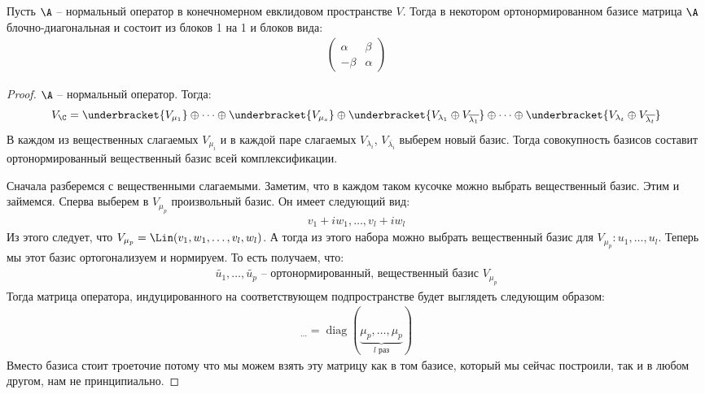 \begin{theorem}
    Пусть $\A$ -- нормальный оператор в конечномерном евклидовом пространстве $V$.
    Тогда в некотором ортонормированном базисе матрица $\A$ блочно-диагональная и состоит из блоков 1 на 1 и блоков вида:
    \begin{gather*}
        \left(\begin{array}{cc}
            \alpha & \beta \\ 
            -\beta & \alpha
        \end{array}\right)
    \end{gather*}
\begin{proof}
    $\A$ -- нормальный оператор. Тогда:
    \begin{gather*}
        V_{\C} = \underbracket{V_{\mu_1}} \oplus \dots \oplus \underbracket{V_{\mu_s}} \oplus \underbracket{V_{\lambda_1} \oplus V_{\overline{\lambda_1}}} \oplus \dots \oplus \underbracket{V_{\lambda_t} \oplus V_{\overline{\lambda_t}}}
    \end{gather*}
    В каждом из вещественных слагаемых $V_{\mu_i}$ и в каждой паре слагаемых $V_{\lambda_i}$, $V_{\overline{\lambda_i}}$ выберем новый базис. 
    Тогда совокупность базисов составит ортонормированный вещественный базис всей комплексификации.
    
    Сначала разберемся с вещественными слагаемыми.
    Заметим, что в каждом таком кусочке можно выбрать вещественный базис.
    Этим и займемся. 
    Сперва выберем в $V_{\mu_p}$ произвольный базис. Он имеет следующий вид:
    \begin{gather*}
        v_1 + iw_1, \dots, v_l + i w_l
    \end{gather*}
    Из этого следует, что $V_{\mu_p} = \Lin (v_1, w_1, \dots, v_l, w_l)$. А тогда
    из этого набора можно выбрать вещественный базис для $V_{\mu_p}: u_1, \dots, u_l$. 
    Теперь мы этот базис ортогонализуем и нормируем. То есть получаем, что:
    \begin{gather*}
        \widetilde{u_1}, \dots, \widetilde{u_p} \text{ -- ортонормированный, вещественный базис } V_{\mu_p}
    \end{gather*}
    Тогда матрица оператора, индуцированного на соответствующем подпространстве будет выглядеть следующим образом: 
    \begin{gather*}
        [\A \, |_{V_{\mu_p} }]_{\dots} = \operatorname{diag} (\underbrace{\mu_p, \dots, \mu_p}_{\text{$l$ раз}})
    \end{gather*}
    Вместо базиса стоит троеточие потому что мы можем взять эту матрицу как в том базисе, который мы сейчас построили, так 
    и в любом другом, нам не принципиально. 


\end{proof}
\end{theorem}
